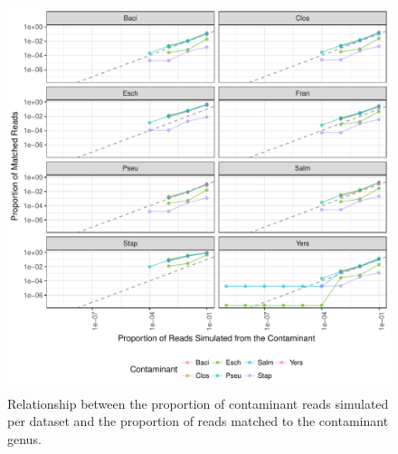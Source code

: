 \documentclass[fleqn,10pt,lineno]{wlpeerj}\usepackage[]{graphicx}\usepackage[]{color}
\makeatletter
\def\maxwidth{ %
  \ifdim\Gin@nat@width>\linewidth
    \linewidth
  \else
    \Gin@nat@width
  \fi
}
\newenvironment{knitrout}{}{} %
\makeatother
\begin{document}
\begin{knitrout}
\color{fgcolor}\begin{figure}
\includegraphics[width=\maxwidth]{figure/contam_fig-1.pdf} \caption[Relationship between the proportion of contaminant reads simulated per dataset and the proportion of reads matched to the contaminant genus]{Relationship between the proportion of contaminant reads simulated per dataset and the proportion of reads matched to the contaminant genus.}\label{fig:contam_fig}
\end{figure}


\end{knitrout}
\end{document}
